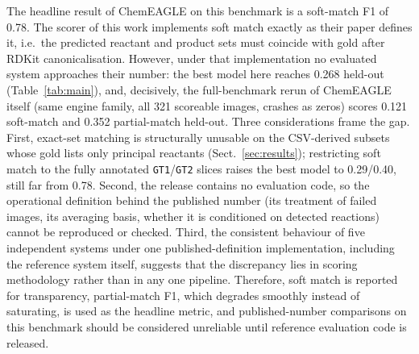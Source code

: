 \documentclass{article}
\begin{document}
The headline result of ChemEAGLE on this benchmark is a soft-match F1
of 0.78.\citep{Chen2025ChemEagle} The scorer of this work implements
soft match exactly as their paper defines it, i.e.\ the predicted
reactant and product sets must coincide with gold after RDKit
canonicalisation. However, under that implementation no evaluated
system approaches their number: the best model here reaches 0.268
held-out (Table~\ref{tab:main}), and, decisively, the full-benchmark
rerun of ChemEAGLE itself (same engine family, all 321 scoreable
images, crashes as zeros) scores 0.121 soft-match and 0.352
partial-match held-out. Three considerations frame the gap. First,
exact-set matching is structurally unusable on the CSV-derived subsets
whose gold lists only principal reactants (Sect.~\ref{sec:results});
restricting soft match to the fully annotated
\texttt{GT1}/\texttt{GT2} slices raises the best model to 0.29/0.40,
still far from 0.78. Second, the release contains no evaluation code,
so the operational definition behind the published number (its
treatment of failed images, its averaging basis, whether it is
conditioned on detected reactions) cannot be reproduced or checked.
Third, the consistent behaviour of five independent systems under one
published-definition implementation, including the reference system
itself, suggests that the discrepancy lies in scoring methodology
rather than in any one pipeline. Therefore, soft match is reported for
transparency, partial-match F1, which degrades smoothly instead of
saturating, is used as the headline metric, and published-number
comparisons on this benchmark should be considered unreliable until
reference evaluation code is released.
\end{document}
